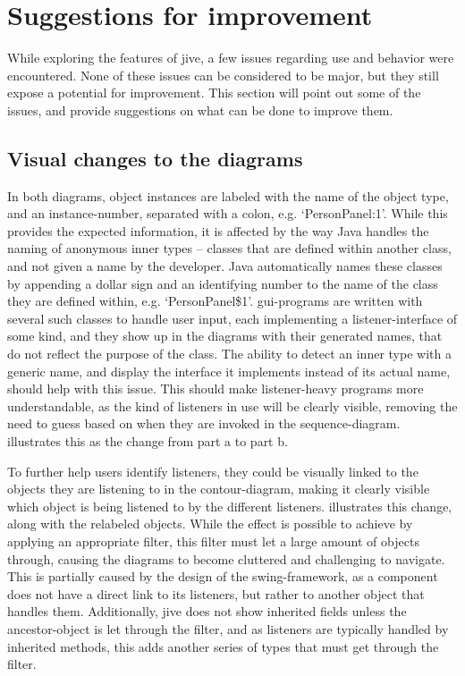 \section{Suggestions for improvement}\label{jiveSuggestions}

While exploring the features of \gls{jive}, a few issues regarding use and behavior were encountered.
None of these issues can be considered to be major, but they still expose a potential for improvement.
This section will point out some of the issues, and provide suggestions on what can be done to improve them.


\subsection{Visual changes to the diagrams}\label{jiveSuggestionsVisual}
In both diagrams, object instances are labeled with the name of the object type, and an instance-number, separated with a colon, e.g. `PersonPanel:1'.
While this provides the expected information, it is affected by the way Java handles the naming of anonymous inner types -- classes that are defined within another class, and not given a name by the developer.
Java automatically names these classes by appending a dollar sign and an identifying number to the name of the class they are defined within, e.g. `PersonPanel\$1'.
\gls{gui}-programs are written with several such classes to handle user input, each implementing a listener-interface of some kind, and they show up in the diagrams with their generated names, that do not reflect the purpose of the class.
The ability to detect an inner type with a generic name, and display the interface it implements instead of its actual name, should help with this issue.
This should make listener-heavy programs more understandable, as the kind of listeners in use will be clearly visible, removing the need to guess based on when they are invoked in the sequence-diagram.
 illustrates this as the change from part a to part b.


To further help users identify listeners, they could be visually linked to the objects they are listening to in the contour-diagram, making it clearly visible which object is being listened to by the different listeners.
 illustrates this change, along with the relabeled objects.
While the effect is possible to achieve by applying an appropriate filter, this filter must let a large amount of objects through, causing the diagrams to become cluttered and challenging to navigate.
This is partially caused by the design of the swing-framework, as a component does not have a direct link to its listeners, but rather to another object that handles them.
Additionally, \gls{jive} does not show inherited fields unless the ancestor-object is let through the filter, and as listeners are typically handled by inherited methods, this adds another series of types that must get through the filter.

